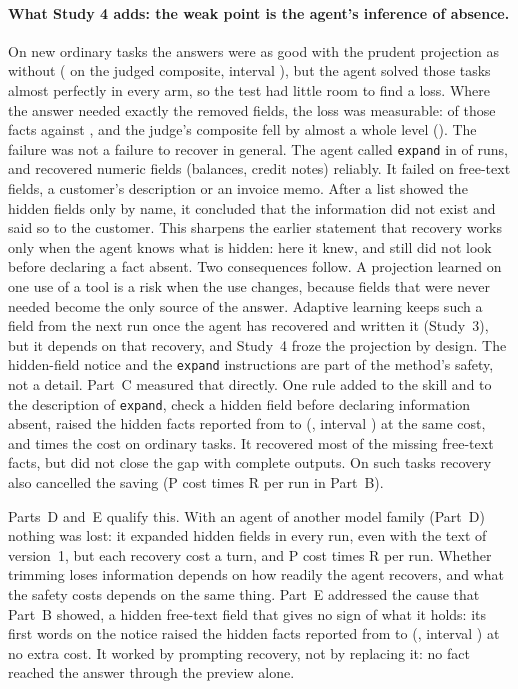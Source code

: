 \paragraph{What Study 4 adds: the weak point is the agent's inference of absence.} On new ordinary tasks the
answers were as good with the prudent projection as without (\SfourAPoint{} on the judged composite, interval
\SfourACI{}), but the agent solved those tasks almost perfectly in every arm, so the test had little room to find a
loss. Where the answer needed exactly the removed fields, the loss was measurable: \SfourBHiddenP{} of those facts
against \SfourBHiddenR{}, and the judge's composite fell by almost a whole level (\SfourBCompositePoint{}). The failure was not a failure to recover
in general. The agent called \texttt{expand} in \SfourBExpandRuns{} of \SfourBRunsPerArm{} runs, and recovered
numeric fields (balances, credit notes) reliably. It failed on free-text fields, a customer's description or an
invoice memo. After a list showed the hidden fields only by name, it concluded that the information did not exist
and said so to the customer. This sharpens the earlier statement that recovery works only when the agent knows what
is hidden: here it knew, and still did not look before declaring a fact absent. Two consequences follow. A
projection learned on one use of a tool is a risk when the use changes, because fields that were never needed
become the only source of the answer. Adaptive learning keeps such a field from the next run once the agent has
recovered and written it (Study~3), but it depends on that recovery, and Study~4 froze the projection by design. The hidden-field notice and the \texttt{expand} instructions are part of the
method's safety, not a detail. Part~C measured that directly. One rule added to the skill and to the description
of \texttt{expand}, check a hidden field before declaring information absent, raised the hidden facts reported
from \SfourCHiddenPone{} to \SfourCHiddenPtwo{} (\SfourCPoint{}, interval \SfourCCI{}) at the same cost, and
\SfourCOrdinaryCost{} times the cost on ordinary tasks. It recovered most of the missing free-text facts, but did
not close the gap with complete outputs. On such tasks recovery also cancelled the saving (P cost \SfourBCost{}
times R per run in Part~B).

Parts~D and~E qualify this. With an agent of another model family (Part~D) nothing was lost: it expanded hidden
fields in every run, even with the text of version~1, but each recovery cost a turn, and P cost \SfourDCostPone{}
times R per run. Whether trimming loses information depends on how readily the agent recovers, and what the safety
costs depends on the same thing. Part~E addressed the cause that Part~B showed, a hidden free-text field that gives
no sign of what it holds: its first words on the notice raised the hidden facts reported from \SfourEHiddenPtwo{} to
\SfourEHiddenPtwoT{} (\SfourEPoint{}, interval \SfourECI{}) at no extra cost. It worked by prompting recovery, not by
replacing it: no fact reached the answer through the preview alone.
